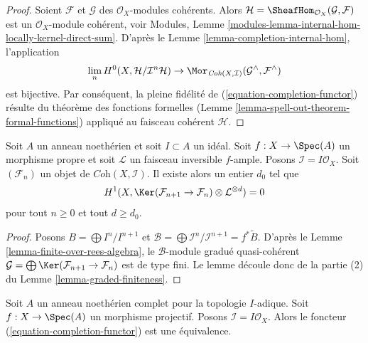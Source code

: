 \begin{proof}
Soient $\mathcal{F}$ et $\mathcal{G}$ des $\mathcal{O}_X$-modules cohérents.
Alors $\mathcal{H} = \SheafHom_{\mathcal{O}_X}(\mathcal{G}, \mathcal{F})$
est un $\mathcal{O}_X$-module cohérent, voir
Modules, Lemme \ref{modules-lemma-internal-hom-locally-kernel-direct-sum}.
D'après le Lemme \ref{lemma-completion-internal-hom}, l'application
$$
\lim_n H^0(X, \mathcal{H}/\mathcal{I}^n\mathcal{H})
\to
\Mor_{\textit{Coh}(X, \mathcal{I})}
(\mathcal{G}^\wedge, \mathcal{F}^\wedge)
$$
est bijective. Par conséquent, la pleine fidélité de
(\ref{equation-completion-functor}) résulte du théorème des fonctions
formelles (Lemme \ref{lemma-spell-out-theorem-formal-functions})
appliqué au faisceau cohérent $\mathcal{H}$.
\end{proof}

\begin{lemma}
\label{lemma-vanishing-projective}
Soit $A$ un anneau noethérien et soit $I \subset A$ un idéal.
Soit $f : X \to \Spec(A)$ un morphisme propre et soit
$\mathcal{L}$ un faisceau inversible $f$-ample. Posons
$\mathcal{I} = I\mathcal{O}_X$. Soit $(\mathcal{F}_n)$ un
objet de $\textit{Coh}(X, \mathcal{I})$. Il existe alors un
entier $d_0$ tel que
$$
H^1(X, \Ker(\mathcal{F}_{n + 1} \to \mathcal{F}_n)
\otimes \mathcal{L}^{\otimes d} )
= 0
$$
pour tout $n \geq 0$ et tout $d \geq d_0$.
\end{lemma}

\begin{proof}
Posons $B = \bigoplus I^n/I^{n + 1}$ et
$\mathcal{B} = \bigoplus \mathcal{I}^n/\mathcal{I}^{n + 1} = f^*\widetilde{B}$.
D'après le Lemme \ref{lemma-finite-over-rees-algebra}, le
$\mathcal{B}$-module gradué quasi-cohérent
$\mathcal{G} = \bigoplus \Ker(\mathcal{F}_{n + 1} \to \mathcal{F}_n)$
est de type fini. Le lemme découle donc de la partie (2) du
Lemme \ref{lemma-graded-finiteness}.
\end{proof}

\begin{lemma}
\label{lemma-existence-projective}
Soit $A$ un anneau noethérien complet pour la topologie $I$-adique.
Soit $f : X \to \Spec(A)$ un morphisme projectif. Posons
$\mathcal{I} = I\mathcal{O}_X$.
Alors le foncteur (\ref{equation-completion-functor}) est une équivalence.
\end{lemma}

